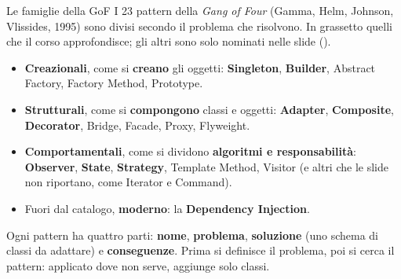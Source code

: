 \begin{guida}{Le famiglie della GoF}
I 23 pattern della \textit{Gang of Four} (Gamma, Helm, Johnson, Vlissides, 1995) sono divisi secondo il problema che
risolvono. In grassetto quelli che il corso approfondisce; gli altri sono solo nominati nelle slide ().
\begin{itemize}[nosep, leftmargin=*]
  \item \textbf{Creazionali}, come si \textbf{creano} gli oggetti: \textbf{Singleton}, \textbf{Builder}, Abstract
        Factory, Factory Method, Prototype.
  \item \textbf{Strutturali}, come si \textbf{compongono} classi e oggetti: \textbf{Adapter}, \textbf{Composite},
        \textbf{Decorator}, Bridge, Facade, Proxy, Flyweight.
  \item \textbf{Comportamentali}, come si dividono \textbf{algoritmi e responsabilità}: \textbf{Observer},
        \textbf{State}, \textbf{Strategy}, Template Method, Visitor (e altri che le slide non riportano, come Iterator
        e Command).
  \item Fuori dal catalogo, \textbf{moderno}: la \textbf{Dependency Injection}.
\end{itemize}
Ogni pattern ha quattro parti: \textbf{nome}, \textbf{problema}, \textbf{soluzione} (uno schema di classi da adattare)
e \textbf{conseguenze}. Prima si definisce il problema, poi si cerca il pattern: applicato dove non serve, aggiunge
solo classi.
\end{guida}
